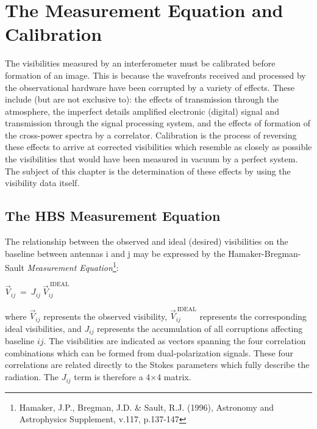 

\chapter[Appendix: The Measurement Equation and Calibration]
         {The Measurement Equation and Calibration}
\label{chapter:me}

The visibilities measured by an interferometer must be calibrated before
formation of an image. This is because the wavefronts received and
processed by the observational hardware have been corrupted by a
variety of effects. These include (but are not exclusive to): the
effects of transmission through 
the atmosphere, the imperfect details amplified electronic (digital)
signal and transmission through the signal processing system, and the
effects of formation of the cross-power spectra by a
correlator. Calibration is the process of reversing these effects to
arrive at corrected visibilities which resemble as closely as possible
the visibilities that would have been measured in vacuum by a perfect
system. The subject of this chapter is the
determination of these effects by using the visibility data itself. 

\section{The HBS Measurement Equation}
\label{section:me.intro}

The relationship between the observed and ideal (desired) visibilities
on the baseline between antennas i and j may be expressed by the
Hamaker-Bregman-Sault {\it Measurement Equation}\footnote{Hamaker, 
J.P., Bregman, J.D. \& Sault, R.J. (1996), Astronomy and Astrophysics
Supplement, v.117, p.137-147}:

$\vec{V}_{ij}~=~J_{ij}~\vec{V}_{ij}^{\mathrm{~IDEAL}}$

where $\vec{V}_{ij}$ represents the observed visibility,
$\vec{V}_{ij}^{\mathrm{~IDEAL}}$ represents the corresponding ideal
visibilities, and $J_{ij}$ represents the accumulation of all
corruptions affecting baseline $ij$. The visibilities are indicated as
vectors spanning the four correlation combinations which can be formed
from dual-polarization signals. These four correlations are related
directly to the Stokes parameters which fully describe the
radiation. The $J_{ij}$ term is therefore a 4$\times$4 matrix. 


